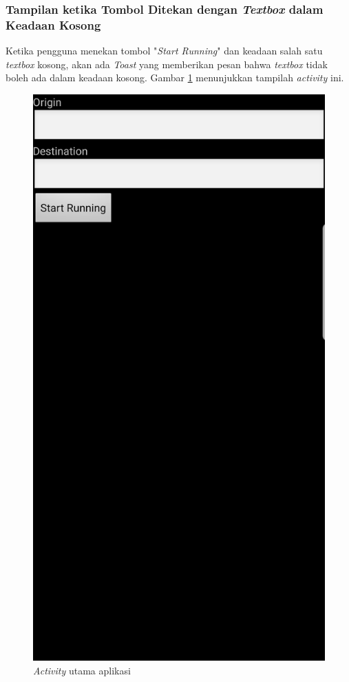\subsubsection{Tampilan ketika Tombol Ditekan dengan \textit{Textbox} dalam Keadaan Kosong}
Ketika pengguna menekan tombol "\textit{Start Running}" dan keadaan salah satu \textit{textbox} kosong, akan ada \textit{Toast} yang memberikan pesan bahwa \textit{textbox} tidak boleh ada dalam keadaan kosong. Gambar \ref{fig:main-page} menunjukkan tampilah \textit{activity} ini.

\begin{figure}
\centering
\includegraphics[scale=0.2]{Gambar/main-page.png}
    \caption{\textit{Activity} utama aplikasi}\label{fig:main-page}
\end{figure}

